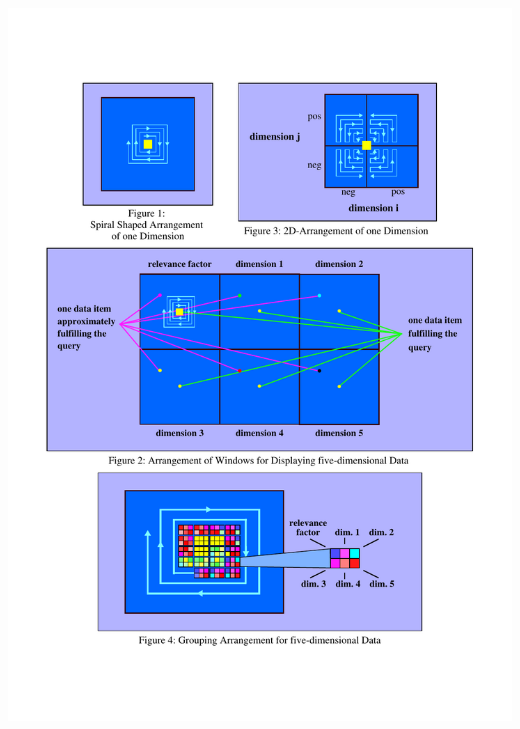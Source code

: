 \begin{itemize}
\hspace*{-2cm}\parbox [h]{0.35\textwidth }{
    \includegraphics [width=\linewidth]{figures/pixel_keim_spiral.pdf}
    \label{fig:pixel-spiral}
}
\hfill
\parbox [h]{0.33\textwidth }{
}
\end{itemize}
